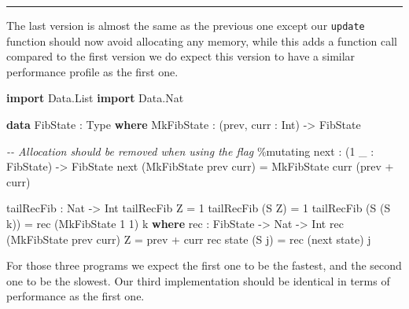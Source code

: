 \documentclass[
]{article}
\newenvironment{Shaded}{}{}
\newcommand{\CommentTok}[1]{\textcolor[rgb]{0.38,0.63,0.69}{\textit{#1}}}
\newcommand{\DataTypeTok}[1]{\textcolor[rgb]{0.56,0.13,0.00}{#1}}
\newcommand{\DecValTok}[1]{\textcolor[rgb]{0.25,0.63,0.44}{#1}}
\newcommand{\KeywordTok}[1]{\textcolor[rgb]{0.00,0.44,0.13}{\textbf{#1}}}
\newcommand{\NormalTok}[1]{#1}
\newcommand{\OperatorTok}[1]{\textcolor[rgb]{0.40,0.40,0.40}{#1}}
\newcommand{\OtherTok}[1]{\textcolor[rgb]{0.00,0.44,0.13}{#1}}
\begin{document}
\begin{center}\rule{0.5\linewidth}{0.5pt}\end{center}

The last version is almost the same as the previous one except our
\texttt{update} function should now avoid allocating any memory, while
this adds a function call compared to the first version we do expect
this version to have a similar performance profile as the first one.

\begin{Shaded}
\begin{Highlighting}[]
\KeywordTok{import} \DataTypeTok{Data.List}
\KeywordTok{import} \DataTypeTok{Data.Nat}

\KeywordTok{data} \DataTypeTok{FibState} \OperatorTok{:} \DataTypeTok{Type} \KeywordTok{where}
  \DataTypeTok{MkFibState} \OperatorTok{:}\NormalTok{ (prev, curr }\OperatorTok{:}  \DataTypeTok{Int}\NormalTok{) }\OtherTok{{-}\textgreater{}} \DataTypeTok{FibState}

\CommentTok{{-}{-} Allocation should be removed when using the flag}
\OperatorTok{\%}\NormalTok{mutating}
\NormalTok{next }\OperatorTok{:}\NormalTok{ (}\DecValTok{1}\NormalTok{ \_ }\OperatorTok{:} \DataTypeTok{FibState}\NormalTok{) }\OtherTok{{-}\textgreater{}} \DataTypeTok{FibState}
\NormalTok{next (}\DataTypeTok{MkFibState}\NormalTok{ prev curr) }\OtherTok{=} \DataTypeTok{MkFibState}\NormalTok{ curr (prev }\OperatorTok{+}\NormalTok{ curr)}

\NormalTok{tailRecFib }\OperatorTok{:} \DataTypeTok{Nat} \OtherTok{{-}\textgreater{}} \DataTypeTok{Int}
\NormalTok{tailRecFib }\DataTypeTok{Z} \OtherTok{=} \DecValTok{1}
\NormalTok{tailRecFib (}\DataTypeTok{S} \DataTypeTok{Z}\NormalTok{) }\OtherTok{=} \DecValTok{1}
\NormalTok{tailRecFib (}\DataTypeTok{S}\NormalTok{ (}\DataTypeTok{S}\NormalTok{ k)) }\OtherTok{=}\NormalTok{ rec (}\DataTypeTok{MkFibState} \DecValTok{1} \DecValTok{1}\NormalTok{) k}
  \KeywordTok{where}
\NormalTok{    rec }\OperatorTok{:} \DataTypeTok{FibState} \OtherTok{{-}\textgreater{}} \DataTypeTok{Nat} \OtherTok{{-}\textgreater{}} \DataTypeTok{Int}
\NormalTok{    rec (}\DataTypeTok{MkFibState}\NormalTok{ prev curr) }\DataTypeTok{Z} \OtherTok{=}\NormalTok{ prev }\OperatorTok{+}\NormalTok{ curr}
\NormalTok{    rec state (}\DataTypeTok{S}\NormalTok{ j) }\OtherTok{=}\NormalTok{ rec (next state) j}
\end{Highlighting}
\end{Shaded}

For those three programs we expect the first one to be the fastest, and
the second one to be the slowest. Our third implementation should be
identical in terms of performance as the first one.
\end{document}
